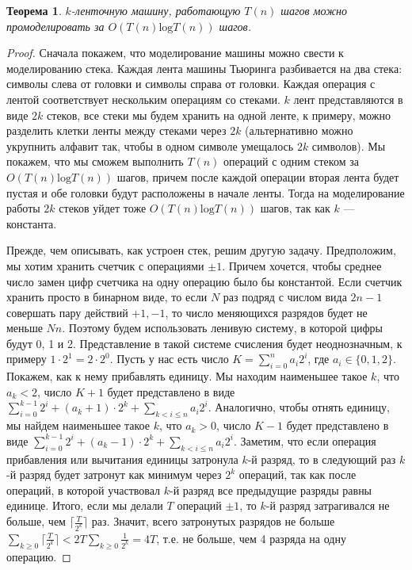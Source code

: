 \documentclass[a4paper]{article}
\theoremstyle{indented}
\newtheorem{theorem}{Теорема}
\theoremstyle{definition}
\theoremstyle{remark}
\begin{document}
\begin{theorem}
    $k$-ленточную машину, работающую $T(n)$ шагов можно промоделировать за $O(T(n)\mathrm{l}\mathrm{o}\mathrm{g}T(n))$ шагов.
\end{theorem}

\begin{proof}
    Сначала покажем, что моделирование машины можно свести к моделированию стека. Каждая лента машины Тьюринга разбивается на два стека: символы слева от головки и символы справа от головки. Каждая операция с лентой соответствует нескольким операциям со стеками. $k$ лент представляются в виде $2k$ стеков, все стеки мы будем хранить на одной ленте, к примеру, можно разделить клетки ленты между стеками через $2k$ (альтернативно можно укрупнить алфавит так, чтобы в одном символе умещалось $2k$ символов). Мы покажем, что мы сможем выполнить $T(n)$ операций с одним стеком за $O(T(n)\mathrm{l}\mathrm{o}\mathrm{g}T(n))$ шагов, причем после каждой операции вторая лента будет пустая и обе головки будут расположены в начале ленты. Тогда на моделирование работы $2k$ стеков уйдет тоже $O(T(n)\mathrm{l}\mathrm{o}\mathrm{g}T(n))$ шагов, так как $k$ — константа.
    
    Прежде, чем описывать, как устроен стек, решим другую задачу. Предположим, мы хотим хранить счетчик с операциями $\pm 1$. Причем хочется, чтобы среднее число замен цифр счетчика на одну операцию было бы константой. Если счетчик хранить просто в бинарном виде, то если $N$ раз подряд с числом вида $2n  -  1$ совершать пару действий $+1, - 1$, то число меняющихся разрядов будет не меньше $Nn$. Поэтому будем использовать ленивую систему, в которой цифры будут 0, 1 и 2. Представление в такой системе счисления будет неоднозначным, к примеру $1 \cdot  2^1 = 2 \cdot  2^0$. Пусть у нас есть число $K = \sum_{i=0}^n a_i2^i$, где $a_i \in  \{ 0, 1, 2\}$. Покажем, как к нему прибавлять единицу. Мы находим наименьшее такое $k$, что $a_k < 2$, число $K + 1$ будет представлено в виде $\sum_{i=0}^{k-1} 2^i + (a_k + 1) \cdot  2^k + \sum_{k < i \leq n}  a_i2^i$. Аналогично, чтобы отнять единицу, мы найдем наименьшее такое $k$, что $a_k > 0$, число $K  -  1$ будет представлено в виде $\sum_{i=0}^{k-1} 2^i + (a_k  -  1) \cdot  2^k + \sum_{k<i\leq n} a_i2^i$. Заметим, что если операция прибавления или вычитания единицы затронула $k$-й разряд, то в следующий раз $k$-й разряд будет затронут как минимум через $2^k$ операций, так как после операций, в которой участвовал $k$-й разряд все предыдущие разряды равны единице. Итого, если мы делали $T$ операций $\pm 1$, то $k$-й разряд затрагивался не больше, чем $\lceil  \frac{T}{2^k} \rceil$  раз. Значит, всего затронутых разрядов не больше $\sum_{k\geq 0} \lceil \frac{T}{2^k} \rceil < 2T \sum_{k\geq 0} \frac{1}{2^k} =4T$, т.е. не больше, чем 4 разряда на одну операцию. 
    

\end{proof}
\end{document}
